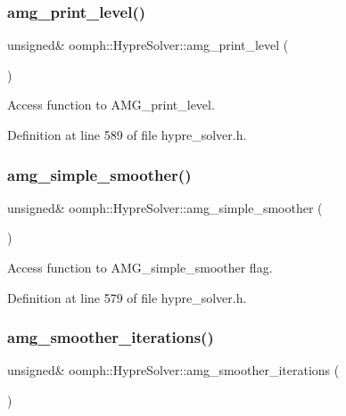 \subsubsection{\texorpdfstring{amg\+\_\+print\+\_\+level()}{amg\_print\_level()}}
{\footnotesize\ttfamily unsigned\& oomph\+::\+Hypre\+Solver\+::amg\+\_\+print\+\_\+level (\begin{DoxyParamCaption}{ }\end{DoxyParamCaption})\hspace{0.3cm}{\ttfamily [inline]}}



Access function to A\+M\+G\+\_\+print\+\_\+level. 



Definition at line 589 of file hypre\+\_\+solver.\+h.

\mbox{\label{classoomph_1_1HypreSolver_a03802971bc875e562bf91c779188e210}} 
\subsubsection{\texorpdfstring{amg\+\_\+simple\+\_\+smoother()}{amg\_simple\_smoother()}}
{\footnotesize\ttfamily unsigned\& oomph\+::\+Hypre\+Solver\+::amg\+\_\+simple\+\_\+smoother (\begin{DoxyParamCaption}{ }\end{DoxyParamCaption})\hspace{0.3cm}{\ttfamily [inline]}}



Access function to A\+M\+G\+\_\+simple\+\_\+smoother flag. 



Definition at line 579 of file hypre\+\_\+solver.\+h.

\mbox{\label{classoomph_1_1HypreSolver_acd44bfa532703a7a60ca538531e6ee09}} 
\subsubsection{\texorpdfstring{amg\+\_\+smoother\+\_\+iterations()}{amg\_smoother\_iterations()}}
{\footnotesize\ttfamily unsigned\& oomph\+::\+Hypre\+Solver\+::amg\+\_\+smoother\+\_\+iterations (\begin{DoxyParamCaption}{ }\end{DoxyParamCaption})\hspace{0.3cm}{\ttfamily [inline]}}



